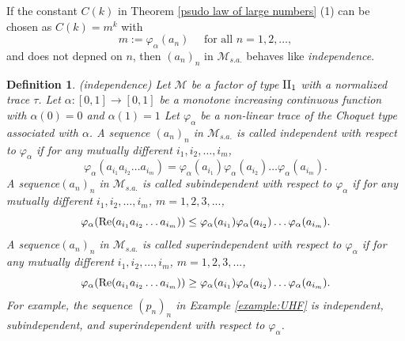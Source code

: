 \documentclass[a4paper,12pt]{amsart}
\newtheorem{definition}{Definition}[section]
\newcommand{\M}{\mathcal{M}}
\begin{document}

\vspace{10mm}

If the constant $C(k)$ in Theorem \ref{psudo law of large numbers}  (1) can be chosen as $C(k) = m^k$ with 
$$
m:= \varphi_\alpha (a_n)  \quad \text{ for all } n=1,2, \ldots, 
$$
and does not depned on $n$, then $(a_n)_n$ in $\M_{s.a.}$ behaves like {\it independence}.  

\begin{definition} \rm (independence)
Let $\M$ be a factor of type ${\rm II}_1$ with a normalized trace $\tau$.  
Let $\alpha: [0,1]  \rightarrow [0, 1]$ be a 
monotone increasing continuous function with $\alpha(0) = 0$ and $\alpha(1) = 1$ 
Let $\varphi_{\alpha}$  be a non-linear trace of the Choquet type associated with $\alpha$. 
A sequence $(a_n)_n$ in $\M_{s.a.}$ is called {\it independent} with respect to $\varphi_{\alpha}$  
if for any mutually different $i_1, i_2, \ldots, i_m$, 
$$
\varphi_{\alpha}(a_{i_1}a_{i_2} \dots a_{i_m})
= \varphi_{\alpha}(a_{i_1}) \varphi_{\alpha}(a_{i_2})  \dots \varphi_{\alpha}(a_{i_m}). 
$$
A sequence$(a_n)_n$ in ${\M}_{s.a.}$ is called {\it subindependent} with respect to $\varphi_{\alpha}$   if 
for any mutually different $i_1, i_2, \dots, i_m$, $m = 1,2,3,...$, 
$$
\varphi_{\alpha}({\rm Re} (a_{i_1}a_{i_2} \dots a_{i_m}) )
\leq \varphi_{\alpha}(a_{i_1}) \varphi_{\alpha}(a_{i_2})  \dots \varphi_{\alpha}(a_{i_m}). 
$$
A sequence$(a_n)_n$ in ${\M}_{s.a.}$ is called {\it superindependent} with respect to $\varphi_{\alpha}$   if 
for any mutually different $i_1, i_2, \dots, i_m$, $m = 1,2,3,...$, 
$$
\varphi_{\alpha}({\rm Re} (a_{i_1}a_{i_2} \dots a_{i_m})) 
\geq \varphi_{\alpha}(a_{i_1}) \varphi_{\alpha}(a_{i_2})  \dots \varphi_{\alpha}(a_{i_m}). 
$$
For example, the sequence $(p_n)_n$ in Example \ref{example:UHF} is independent, subindependent, and superindependent 
with respect to $\varphi_{\alpha}$. 
\end{definition}
\end{document}
